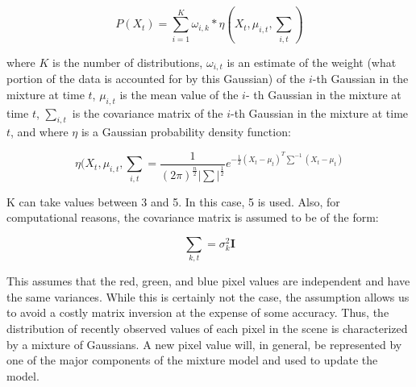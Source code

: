 \documentclass[12pt]{article} %
\begin{document}
\begin{equation}
{P(X_{t}) = \sum_{i=1}^{K}\omega_{i,k} \ast \eta(X_{t},\mu_{i,t}, \sum_{i,t})}
\end{equation}

where $K$ is the number of distributions, $\omega_{i,t}$ is an estimate
of the weight (what portion of the data is accounted for by this Gaussian) of the $i$-th Gaussian in the mixture at time $t$, $\mu_{i,t}$ is the mean value of the $i$- th Gaussian in the mixture at time $t$, $\sum_{i,t}$ is the covariance matrix of the $i$-th Gaussian in the mixture at time $t$, and where $\eta$ is a Gaussian probability density function:

\begin{equation}
\eta(X_{t},\mu_{i,t}, \sum_{i,t} = \frac{1}{(2\pi)^{\frac{n}{2}}|\sum|^{\frac{1}{2}}} e^{-\frac{1}{2}(X_{t}-\mu_{t})^{T}\sum^{-1}(X_{t}-\mu_{t})}
\end{equation}

K can take values between 3 and 5. In this case, 5 is used. Also, for computational reasons, the covariance matrix is assumed to be of the form:

\begin{equation}
{\sum_{k,t} = \sigma_{k}^{2}\textbf{I}}
\end{equation}

This assumes that the red, green, and blue pixel values are independent and have the same variances. While this is certainly not the case, the assumption allows us to avoid a costly matrix inversion at the expense of some accuracy. 
Thus, the distribution of recently observed values
of each pixel in the scene is characterized by a mixture of Gaussians. A new pixel value will, in general, be represented by one of the major components of the mixture model and used to update the model. 








\end{document}
